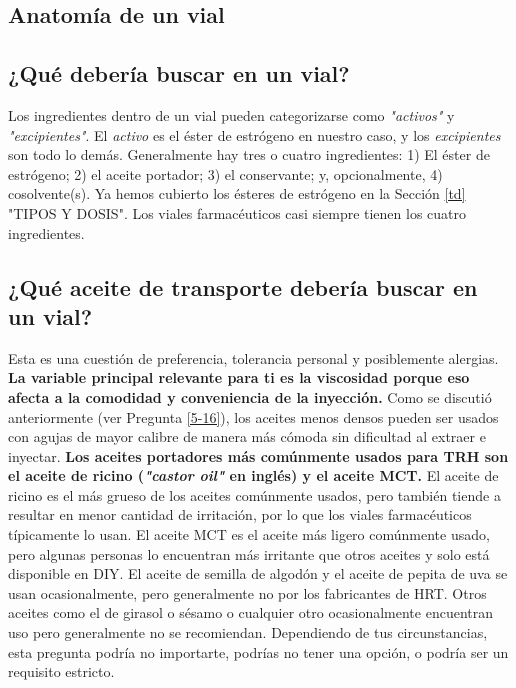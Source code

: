 \documentclass{article}
\begin{document}
\subsection*{Anatomía de un vial}

\subsection{¿Qué debería buscar en un vial?}

Los ingredientes dentro de un vial pueden categorizarse como \textit{"activos"} y \textit{"excipientes"}. El \textit{activo} es el éster de estrógeno en nuestro caso, y los \textit{excipientes} son todo lo demás. Generalmente hay tres o cuatro ingredientes: 1) El éster de estrógeno; 2) el aceite portador; 3) el conservante; y, opcionalmente, 4) cosolvente(s). Ya hemos cubierto los ésteres de estrógeno en la Sección \ref{td} "TIPOS Y DOSIS". Los viales farmacéuticos casi siempre tienen los cuatro ingredientes.

\subsection{¿Qué aceite de transporte debería buscar en un vial?}\label{6-16}

Esta es una cuestión de preferencia, tolerancia personal y posiblemente alergias. \textbf{La variable principal relevante para ti es la viscosidad porque eso afecta a la comodidad y conveniencia de la inyección.} Como se discutió anteriormente (ver Pregunta \ref{5-16}), los aceites menos densos pueden ser usados con agujas de mayor calibre de manera más cómoda sin dificultad al extraer e inyectar. \textbf{Los aceites portadores más comúnmente usados para TRH son el aceite de ricino (\textit{"castor oil"} en inglés) y el aceite MCT.} El aceite de ricino es el más grueso de los aceites comúnmente usados, pero también tiende a resultar en menor cantidad de irritación, por lo que los viales farmacéuticos típicamente lo usan. El aceite MCT es el aceite más ligero comúnmente usado, pero algunas personas lo encuentran más irritante que otros aceites y solo está disponible en DIY. El aceite de semilla de algodón y el aceite de pepita de uva se usan ocasionalmente, pero generalmente no por los fabricantes de HRT. Otros aceites como el de girasol o sésamo o cualquier otro ocasionalmente encuentran uso pero generalmente no se recomiendan. Dependiendo de tus circunstancias, esta pregunta podría no importarte, podrías no tener una opción, o podría ser un requisito estricto.
\end{document}
